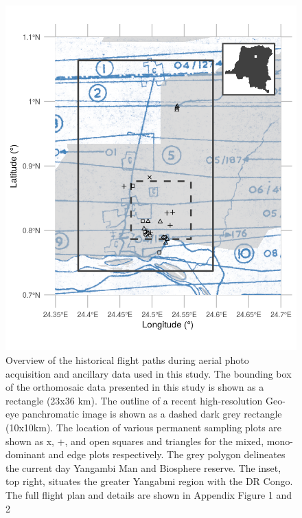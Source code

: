 \documentclass[remote sensing,article,submit,moreauthors,pdftex,10pt,a4paper]{mdpi}
\begin{document}
\begin{figure}
\includegraphics[width=1\linewidth]{./figures/flight_paths} \caption{Overview of the historical flight paths during aerial photo acquisition and ancillary data used in this study. The bounding box of the orthomosaic data presented in this study is shown as a rectangle (23x36 km). The outline of a recent high-resolution Geo-eye panchromatic image is shown as a dashed dark grey rectangle (10x10km). The location of various permanent sampling plots are shown as x, +, and open squares and triangles for the mixed, mono-dominant and edge plots respectively. The grey polygon delineates the current day Yangambi Man and Biosphere reserve. The inset, top right, situates the greater Yangabmi region with the DR Congo. The full flight plan and details are shown in Appendix Figure 1 and 2}\label{fig:unnamed-chunk-2}
\end{figure}
\end{document}
